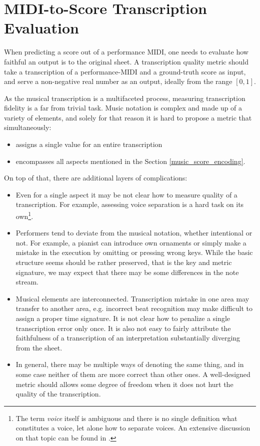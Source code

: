 \chapter{MIDI-to-Score Transcription Evaluation}

When predicting a score out of a performance MIDI, one needs to evaluate how faithful an output is to the original sheet. A transcription quality metric should take a transcription of a performance-MIDI and a ground-truth score as input, and serve a non-negative real number as an output, ideally from the range $[0, 1]$.

As the musical transcription is a multifaceted process, measuring transcription fidelity is a far from trivial task. Music notation is complex and made up of a variety of elements, and solely for that reason it is hard to propose a metric that simultaneously: \begin{itemize}
	\item assigns a single value for an entire transcription
	\item encompasses all aspects mentioned in the Section \ref{music_score_encoding}. 
\end{itemize}

On top of that, there are additional layers of complications: \begin{itemize}
	\item Even for a single aspect it may be not clear how to measure quality of a transcription. For example, assessing voice separation is a hard task on its own\footnote{The term \emph{voice} itself is ambiguous and there is no single definition what constitutes a voice, let alone how to separate voices. An extensive discussion on that topic can be found in \cite{Cambouropoulos2008}.}.
	\item Performers tend to deviate from the musical notation, whether intentional or not. For example, a pianist can introduce own ornaments or simply make a mistake in the execution by omitting or pressing wrong keys. While the basic structure seems should be rather preserved, that is the key and metric signature, we may expect that there may be some differences in the note stream. 
	\item Musical elements are interconnected. Transcription mistake in one area may transfer to another area, e.g. incorrect beat recognition may make difficult to assign a proper time signature. It is not clear how to penalize a single transcription error only once. It is also not easy to fairly attribute the faithfulness of a transcription of an interpretation substantially diverging from the sheet.
	\item In general, there may be multiple ways of denoting the same thing, and in some case neither of them are more correct than other ones. A well-designed metric should allows some degree of freedom when it does not hurt the quality of the transcription.
\end{itemize}

